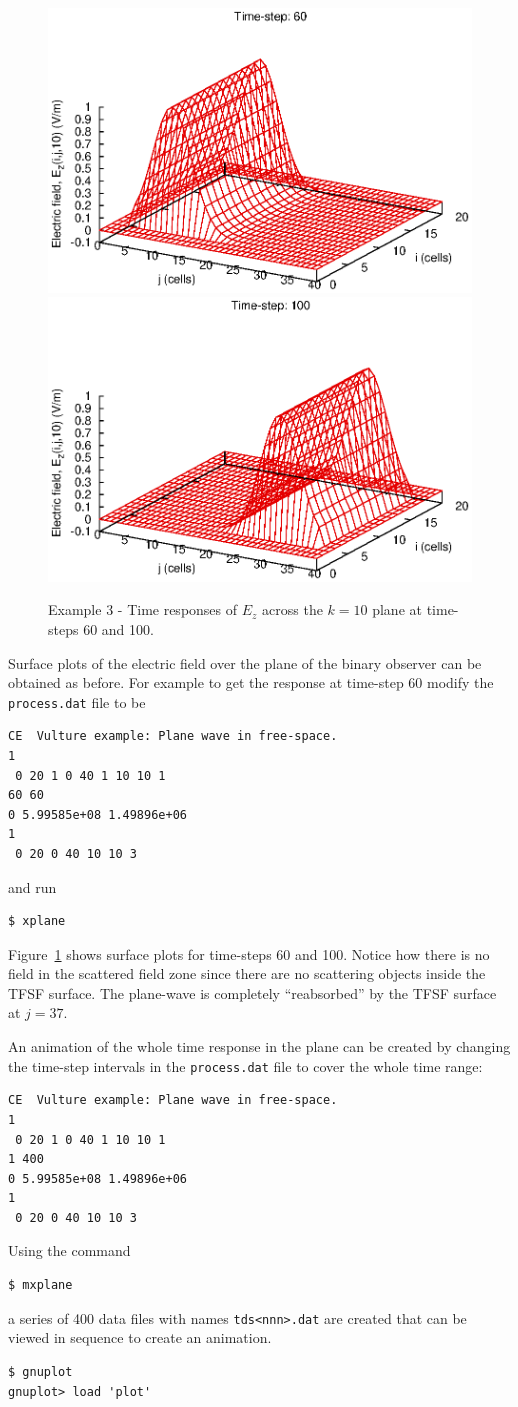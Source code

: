 \documentclass[onecolumn,a4paper]{article}
\numberwithin{equation}{section}
\begin{document}
\begin{figure}[ht!]
\begin{center}
 \includegraphics[width=0.49\linewidth]{figures/planewave_tds60}
 \includegraphics[width=0.49\linewidth]{figures/planewave_tds100}
 \caption{\label{fg:planewave_tds} Example 3 - Time responses of $E_z$ across the $k=10$ plane at time-steps 60 and 100.}
\end{center}
\end{figure}

Surface plots of the electric field over the plane of the binary observer can be obtained as before. For example
to get the response at time-step 60 modify the \texttt{process.dat} file to be
\begin{verbatim}
CE  Vulture example: Plane wave in free-space.
1
 0 20 1 0 40 1 10 10 1
60 60
0 5.99585e+08 1.49896e+06
1
 0 20 0 40 10 10 3
\end{verbatim}
and run 
\begin{verbatim}
$ xplane
\end{verbatim}
Figure~\ref{fg:planewave_tds} shows surface plots for time-steps 60 and 100. Notice how there is no field in the
scattered field zone since there are no scattering objects inside the TFSF surface. The plane-wave is completely
``reabsorbed'' by the TFSF surface at $j=37$.

An animation of the whole time response in the plane can be created by changing the time-step intervals in the
\texttt{process.dat} file to cover the whole time range:
\begin{verbatim}
CE  Vulture example: Plane wave in free-space.
1
 0 20 1 0 40 1 10 10 1
1 400
0 5.99585e+08 1.49896e+06
1
 0 20 0 40 10 10 3
\end{verbatim}
Using the command
\begin{verbatim}
$ mxplane
\end{verbatim}
a series of 400 data files with names \texttt{tds<nnn>.dat} are created that can be viewed in sequence to 
create an animation.
\begin{verbatim}
$ gnuplot
gnuplot> load 'plot'
\end{verbatim}
\end{document}
